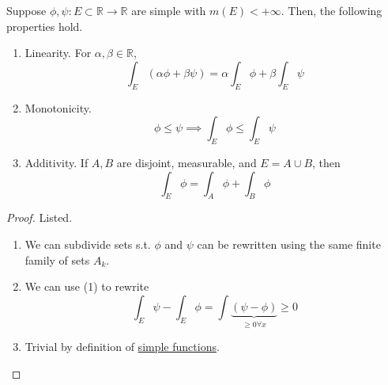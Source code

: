   \begin{theorem}
    \label{thm:axiomatic-properties-of-lebesgue-integral-for}
    Suppose $\phi, \psi: E \subset \mathbb{R} \to \mathbb{R}$ are simple with $m(E) < +\infty$. Then, the following properties hold. 
    \begin{enumerate}
      \item Linearity. For $\alpha, \beta \in \mathbb{R}$, 
        \begin{equation}
          \int_E (\alpha \phi + \beta \psi) = \alpha \int_E \phi + \beta \int_E \psi
        \end{equation}

      \item Monotonicity. 
        \begin{equation}
          \phi \leq \psi \implies \int_E \phi \leq \int_E \psi 
        \end{equation}

      \item Additivity. If $A, B$ are disjoint, measurable, and $E = A \cup B$, then 
        \begin{equation}
          \int_E \phi = \int_A \phi + \int_B \phi
        \end{equation}
    \end{enumerate}
  \end{theorem}
  \begin{proof}
    Listed. 
    \begin{enumerate}
      \item We can subdivide sets s.t. $\phi$ and $\psi$ can be rewritten using the same finite family of sets $A_k$. 
      \item We can use (1) to rewrite 
        \begin{equation}
          \int_E \psi - \int_E \phi = \int \underbrace{(\psi - \phi)}_{\geq 0 \forall x} \geq 0
        \end{equation}

      \item Trivial by definition of \hyperref[def:simple-functions]{simple functions}. 
    \end{enumerate}
  \end{proof}

